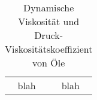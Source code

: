 \begin{table}[htb]
    \centering
    \caption{Dynamische Viskosität und Druck-Viskositätskoeffizient von Öle \cite{esdu_1985}}
    \begin{tabular}{cc}
    blah & blah \\
    \end{tabular}
    \label{tab:dynamic_viscosity_and_pressure_exponents_of_some_lubricants}
\end{table}


